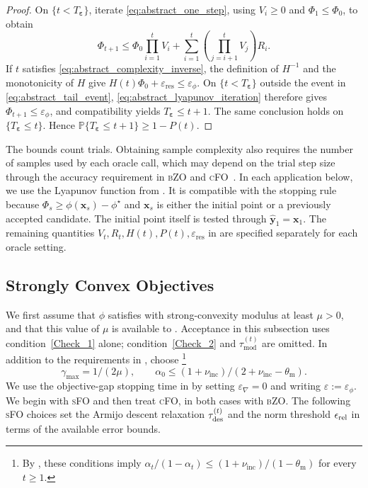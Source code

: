\documentclass{article}
\begin{document}
\begin{proof}
\label{proof_bigtheorem}
On $\{t<T_{\boldsymbol\varepsilon}\}$, iterate \eqref{eq:abstract_one_step}, using $V_i\geq0$ and $\Phi_1\leq\Phi_0$, to obtain
\begin{equation}\label{eq:abstract_lyapunov_iteration}
\textstyle\Phi_{t+1}
\le
\Phi_0\prod_{i=1}^tV_i
+
\sum_{i=1}^t
\left(\prod_{j=i+1}^tV_j\right)R_i.
\end{equation}
If \(t\) satisfies \eqref{eq:abstract_complexity_inverse}, the
definition of \(H^{-1}\) and the monotonicity of \(H\) give
\(H(t)\Phi_0+\varepsilon_{\mathrm{res}}\leq\varepsilon_\phi\).
On \(\{t<T_{\boldsymbol\varepsilon}\}\) outside the event in
\eqref{eq:abstract_tail_event},
\eqref{eq:abstract_lyapunov_iteration} therefore gives
\(\Phi_{t+1}\leq\varepsilon_\phi\), and compatibility yields
\(T_{\boldsymbol\varepsilon}\leq t+1\).
The same conclusion holds on \(\{T_{\boldsymbol\varepsilon}\leq t\}\).
Hence \(\mathbb P\{T_{\boldsymbol\varepsilon}\leq t+1\}\geq1-P(t)\).
\end{proof}

\label{rem:framework_instantiation}
The bounds count trials. Obtaining sample complexity also requires
the number of samples used by each oracle call, which may depend
on the trial step size through the accuracy requirement
in \textsc{bZO} and \textsc{cFO}~\cite{Jin-sample}.
In each application below, we use the Lyapunov function from 
. It is compatible with the stopping rule because $\Phi_s\geq\phi(\bm{x}_s)-\phi^\star$ and $\bm{x}_s$ is either the initial point or a previously accepted candidate. The initial point itself is tested through $\hat{\bm{y}}_1=\bm{x}_1$. The remaining quantities \(V_t,R_t,H(t),P(t),\varepsilon_{\mathrm{res}}\) in  are specified separately for each oracle setting.

\subsection{Strongly Convex Objectives}\label{sub_complexity_>0}
We first assume that $\phi$ satisfies   with strong-convexity modulus at least $\mu>0$, and that this value of $\mu$ is available to . Acceptance in this subsection uses condition~\eqref{Check_1} alone; condition~\eqref{Check_2} and $\tau_{\mathrm{mod}}^{(t)}$ are omitted. In addition to the requirements in , choose \footnote{By
, these conditions imply
\(\alpha_t/(1-\alpha_t)\le
(1+\nu_{\mathrm{inc}})/(1-\theta_{\mathrm{m}})\) for every \(t\ge1\).}
\[
\gamma_{\max}={1}/{(2\mu)},
\qquad
\alpha_0\le
{(1+\nu_{\mathrm{inc}})}/{(2+\nu_{\mathrm{inc}}-\theta_{\mathrm{m}})}.
\]
We use the objective-gap stopping time in  by setting $\varepsilon_\nabla=0$ and writing $\varepsilon:=\varepsilon_\phi$. We begin with \textsc{sFO} and then treat \textsc{cFO}, in both cases with \textsc{bZO}. The following \textsc{sFO} choices set the Armijo descent relaxation $\tau_{\rm des}^{(t)}$ and the norm threshold $\epsilon_{\rm rel}$ in terms of the available error bounds.
\end{document}
